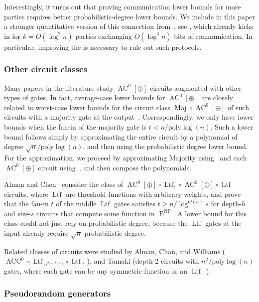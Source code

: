 \documentclass{toc}
\DeclareMathOperator{\Maj}{\mathrm{Maj}}  %
\DeclareMathOperator{\Ltf}{\mathrm{Ltf}}  %
\DeclareMathOperator{\AC}{\mathrm{AC}}  %
\DeclareMathOperator{\ACC}{\mathrm{ACC}}  %
\DeclareMathOperator{\NP}{\mathrm{NP}}  %
\DeclareMathOperator{\EEE}{\mathrm{E}}  %
\newcommand{\poly}{\mathrm{poly}}
\begin{document}
Interestingly, it turns out that proving communication lower bounds
for more parties requires better probabilistic-degree lower bounds.
We include in this paper a stronger quantitative version of this connection
from~\cite{Viola-map}, see , which
already kicks in for $k=O(\log^{2}n)$ parties exchanging $O(\log^{3}n)$
bits of communication. In particular, improving the 
is necessary to rule out such protocols.

\subsubsection{Other circuit classes}

Many papers in the literature study $\AC^{0}[\oplus]$ circuits augmented
with other types of gates. In fact, average-case lower bounds for
$\AC^{0}[\oplus]$ are closely related to worst-case lower bounds for
the circuit class $\Maj\circ \AC^{0}[\oplus]$ of such circuits with
a majority gate at the output~\cite{HMPST93}. Correspondingly, we
only have lower bounds when the fan-in of the majority gate is $t<n/\poly\log(n)$.
Such a lower bound follows simply by approximating the entire circuit
by a polynomial of degree $\sqrt{n}/\poly\log(n)$, and then using
the probabilistic degree lower bound. For the approximation, we proceed
by approximating Majority using~\cite{DBLP:conf/focs/AlmanW15} and
each $\AC^{0}[\oplus]$ circuit using~\cite{Raz87}, and then compose
the polynomials.

Alman and Chen~\cite{AlmanC19} consider the class of 
$\AC^{0}[\oplus]\circ \Ltf_{t}\circ \AC^{0}[\oplus]\circ \Ltf$
circuits, where $\Ltf$ are threshold functions with arbitrary weights,
and prove that the fan-in $t$ of the middle $\Ltf$ gates satisfies
$t\ge n/\log^{O(h)}s$ for depth-$h$ and size-$s$ circuits that
compute some function in $\EEE^{\NP}$. A lower bound for this class could
not just rely on probabilistic degree, because the $\Ltf$ gates at the
input already require $\sqrt{n}$ probabilistic degree.

Related classes of circuits were studied by Alman, Chan, and Williams
($\ACC^{0}\circ \Ltf{}_{n^{2-\Omega(1)}}\circ \Ltf$,
%
\cite[Corollary 1.1]{AlmanCW16}),   %
and Tamaki (depth-2 circuits with $n^{2}/\poly\log(n)$
gates, where each gate can be any symmetric function or an $\Ltf$~\cite{Tamaki16}).

\subsubsection{Pseudorandom generators}
\end{document}
